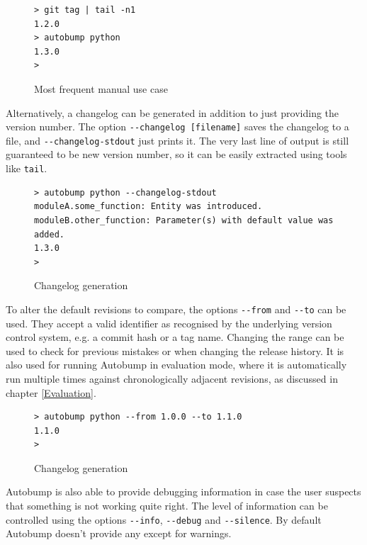 \documentclass{l4proj}
\newcommand\genericstyle{\lstset{basicstyle=\ttm}}
\newcommand\codeinline[1]{{\genericstyle\lstinline!#1!}}
\begin{document}
\begin{figure}[H]
\centering
\caption{Most frequent manual use case}
\begin{BVerbatim}
> git tag | tail -n1
1.2.0
> autobump python
1.3.0
>
\end{BVerbatim}
\end{figure}

Alternatively, a changelog can be generated in addition to just
providing the version number. The option \codeinline{--changelog
[filename]} saves the changelog to a file, and
\codeinline{--changelog-stdout} just prints it. The very last line of
output is still guaranteed to be new version number, so it can be
easily extracted using tools like \codeinline{tail}.

\begin{figure}[H]
\centering
\caption{Changelog generation}
\begin{BVerbatim}
> autobump python --changelog-stdout
moduleA.some_function: Entity was introduced.
moduleB.other_function: Parameter(s) with default value was added.
1.3.0
>
\end{BVerbatim}
\end{figure}

To alter the default revisions to compare, the options
\codeinline{--from} and \codeinline{--to} can be used. They accept a
valid identifier as recognised by the underlying version control
system, e.g. a commit hash or a tag name. Changing the range can be
used to check for previous mistakes or when changing the release
history. It is also used for running Autobump in evaluation mode,
where it is automatically run multiple times against chronologically
adjacent revisions, as discussed in chapter \ref{Evaluation}.

\begin{figure}[H]
\centering
\caption{Changelog generation}
\begin{BVerbatim}
> autobump python --from 1.0.0 --to 1.1.0
1.1.0
>
\end{BVerbatim}
\end{figure}

Autobump is also able to provide debugging information in case the
user suspects that something is not working quite right. The level of
information can be controlled using the options \codeinline{--info},
\codeinline{--debug} and \codeinline{--silence}. By default Autobump
doesn't provide any except for warnings.
\end{document}
